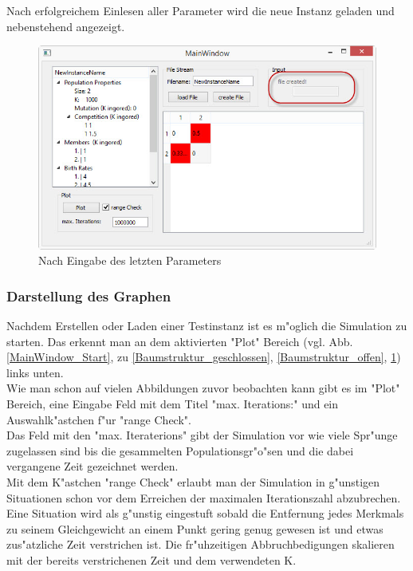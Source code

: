 \documentclass[11pt, a4paper, german]{article}
\theoremstyle{plain}
\begin{document}
	Nach erfolgreichem Einlesen aller Parameter wird die neue Instanz geladen und nebenstehend angezeigt.
	
	\begin{figure}[H]
		\centering
		\includegraphics[width=1\linewidth]{./Pictures/MainWindow_FileCreated}
		\caption[Datei erstellt]{Nach Eingabe des letzten Parameters}
		\label{fig:MainWindow_FileCreated}
	\end{figure}
	
	\subsubsection{Darstellung des Graphen}
	Nachdem Erstellen oder Laden einer Testinstanz ist es m"oglich die Simulation zu starten. Das erkennt man an dem aktivierten "{}Plot"{} Bereich (vgl. Abb. \ref{MainWindow_Start}, zu \ref{Baumstruktur_geschlossen}, \ref{Baumstruktur_offen}, \ref{fig:MainWindow_FileCreated}) links unten.\\
	Wie man schon auf vielen Abbildungen zuvor beobachten kann gibt es im "{}Plot"{} Bereich, eine Eingabe Feld mit dem Titel "{}max. Iterations:"{} und ein Auswahlk"astchen f"ur "{}range Check"{}.\\
	Das Feld mit den "{}max. Iteraterions"{} gibt der Simulation vor wie viele Spr"unge zugelassen sind bis die gesammelten Populationsgr"o"sen und die dabei vergangene Zeit gezeichnet werden. \\
	Mit dem K"astchen "{}range Check"{} erlaubt man der Simulation in g"unstigen Situationen schon vor dem Erreichen der maximalen Iterationszahl abzubrechen. Eine Situation wird als g"unstig eingestuft sobald die Entfernung jedes Merkmals zu seinem Gleichgewicht an einem Punkt gering genug gewesen ist und etwas zus"atzliche Zeit verstrichen ist. Die fr"uhzeitigen Abbruchbedigungen skalieren mit der bereits verstrichenen Zeit und dem verwendeten K.\\
\end{document}

